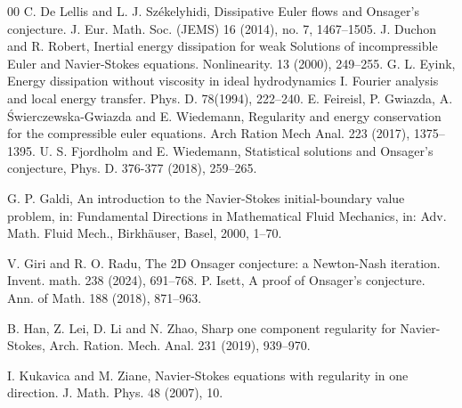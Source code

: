 \documentclass[11pt]{article}
\theoremstyle{plain}\newtheorem{definition}{Definition}[section]
\theoremstyle{definition}\newtheorem{theorem}{Theorem}[section]
\theoremstyle{plain}\newtheorem{lemma}[theorem]{Lemma}
\theoremstyle{plain}\newtheorem{coro}[theorem]{Corollary}
\theoremstyle{plain}\newtheorem{prop}[theorem]{Proposition}
\theoremstyle{remark}\newtheorem{remark}{Remark}[section]
\numberwithin{equation}{section}
\begin{document}
\begin{thebibliography}{00}
\bibitem{[DS2]}
 C. De Lellis and  L.  J.  Sz\'ekelyhidi, Dissipative Euler flows and Onsager's conjecture. J. Eur. Math. Soc. (JEMS) 16 (2014), no. 7, 1467--1505.
\bibitem{[DR]}
 J. Duchon and   R. Robert,  Inertial energy dissipation for weak Solutions of incompressible Euler and
Navier-Stokes equations. Nonlinearity. 13 (2000), 249--255.
\bibitem{[Eyink]}
  G. L. Eyink,  Energy dissipation without viscosity in ideal hydrodynamics I. Fourier
analysis and local energy transfer. Phys. D.  78(1994), 222--240.
 \bibitem{[FGSW]}
E. Feireisl, P. Gwiazda, A. \'Swierczewska-Gwiazda and E. Wiedemann, Regularity and
energy conservation for the compressible euler equations. Arch Ration Mech Anal. 223
(2017), 1375--1395.
 \bibitem{[FW2018]}
U. S. Fjordholm and E.  Wiedemann,  Statistical solutions and Onsager's conjecture,
Phys. D.      376-377 (2018), 259--265.

\bibitem{[Galdi]} G. P. Galdi, An introduction to the Navier-Stokes initial-boundary value problem, in: Fundamental Directions in Mathematical Fluid Mechanics, in: Adv. Math. Fluid Mech., Birkh\"auser, Basel, 2000,   1--70.



\bibitem{[GR]}  V. Giri and R. O. Radu, The 2D Onsager conjecture: a Newton-Nash iteration. Invent. math. 238 (2024), 691--768.
\bibitem{[Isett]}
P. Isett,
A proof of Onsager's conjecture.
Ann. of Math.  188 (2018),  871--963.













\bibitem{[HLLZ]}
B. Han, Z. Lei, D. Li and N. Zhao, Sharp one component regularity for Navier-Stokes,
Arch. Ration. Mech. Anal. 231 (2019), 939--970.









\bibitem{[KZ]}
 I. Kukavica and M. Ziane, Navier-Stokes equations with regularity in one direction. J.
Math. Phys. 48 (2007), 10.




\end{thebibliography}
\end{document}
